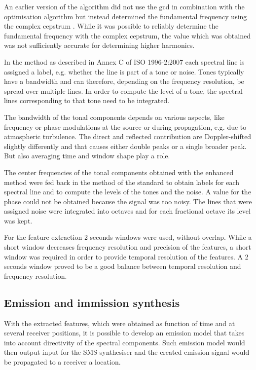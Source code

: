An earlier version of the algorithm did not use the $\mathrm{gcd}$ in
combination with the optimisation algorithm but instead determined the
fundamental frequency using the complex cepstrum \cite{Rietdijk2015}.
While it was possible to reliably determine the fundamental frequency with the
complex cepstrum, the value which was obtained was not sufficiently accurate
for determining higher harmonics.

In the method as described in Annex C of ISO 1996-2:2007 each spectral line is
assigned a label, e.g. whether the line is part of a tone or noise. Tones
typically have a bandwidth and can therefore, depending on the frequency
resolution, be spread over multiple lines. In order to compute the level of a
tone, the spectral lines corresponding to that tone need to be integrated.

The bandwidth of the tonal components depends on various aspects, like frequency
or phase modulations at the source or during propagation, e.g. due to
atmospheric turbulence. The direct and reflected contribution are
Doppler-shifted slightly differently and that causes either double peaks or a
single broader peak. But also averaging time and window shape play a role.

The center frequencies of the tonal components obtained with the enhanced method
were fed back in the method of the standard to obtain labels for each spectral
line and to compute the levels of the tones and the noise.
A value for the phase could not be obtained because the signal was too noisy.
The lines that were assigned noise were integrated into  octaves and for each
fractional octave its level was kept.

For the feature extraction 2 seconds windows were used, without overlap.
While a short window decreases frequency resolution and precision of the features, a short
window was required in order to provide temporal resolution of the features.
A 2 seconds window proved to be a good balance between temporal resolution
and frequency resolution.


\subsection{Emission and immission synthesis}
With the extracted features, which were obtained as function of time and at
several receiver positions, it is possible to develop an emission model that
takes into account directivity of the spectral components. Such emission model
would then output input for the SMS synthesiser and the created emission signal
would be propagated to a receiver a location.

